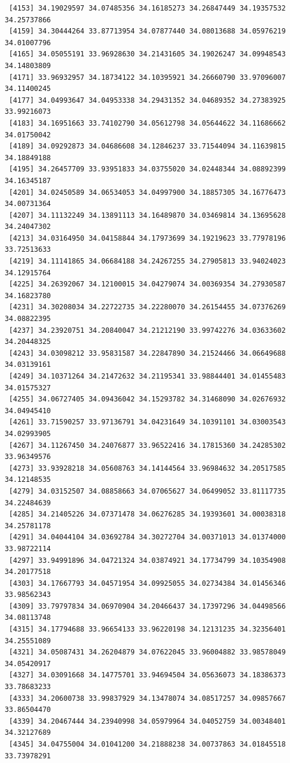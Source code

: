 \documentclass[
  letterpaper,
  DIV=11,
  numbers=noendperiod]{scrartcl}
\begin{document}
\begin{verbatim}
 [4153] 34.19029597 34.07485356 34.16185273 34.26847449 34.19357532 34.25737866
 [4159] 34.30444264 33.87713954 34.07877440 34.08013688 34.05976219 34.01007796
 [4165] 34.05055191 33.96928630 34.21431605 34.19026247 34.09948543 34.14803809
 [4171] 33.96932957 34.18734122 34.10395921 34.26660790 33.97096007 34.11400245
 [4177] 34.04993647 34.04953338 34.29431352 34.04689352 34.27383925 33.99216073
 [4183] 34.16951663 33.74102790 34.05612798 34.05644622 34.11686662 34.01750042
 [4189] 34.09292873 34.04686608 34.12846237 33.71544094 34.11639815 34.18849188
 [4195] 34.26457709 33.93951833 34.03755020 34.02448344 34.08892399 34.16345187
 [4201] 34.02450589 34.06534053 34.04997900 34.18857305 34.16776473 34.00731364
 [4207] 34.11132249 34.13891113 34.16489870 34.03469814 34.13695628 34.24047302
 [4213] 34.03164950 34.04158844 34.17973699 34.19219623 33.77978196 33.72513633
 [4219] 34.11141865 34.06684188 34.24267255 34.27905813 33.94024023 34.12915764
 [4225] 34.26392067 34.12100015 34.04279074 34.00369354 34.27930587 34.16823780
 [4231] 34.30208034 34.22722735 34.22280070 34.26154455 34.07376269 34.08822395
 [4237] 34.23920751 34.20840047 34.21212190 33.99742276 34.03633602 34.20448325
 [4243] 34.03098212 33.95831587 34.22847890 34.21524466 34.06649688 34.03139161
 [4249] 34.10371264 34.21472632 34.21195341 33.98844401 34.01455483 34.01575327
 [4255] 34.06727405 34.09436042 34.15293782 34.31468090 34.02676932 34.04945410
 [4261] 33.71590257 33.97136791 34.04231649 34.10391101 34.03003543 34.02993905
 [4267] 34.11267450 34.24076877 33.96522416 34.17815360 34.24285302 33.96349576
 [4273] 33.93928218 34.05608763 34.14144564 33.96984632 34.20517585 34.12148535
 [4279] 34.03152507 34.08858663 34.07065627 34.06499052 33.81117735 34.22484639
 [4285] 34.21405226 34.07371478 34.06276285 34.19393601 34.00038318 34.25781178
 [4291] 34.04044104 34.03692784 34.30272704 34.00371013 34.01374000 33.98722114
 [4297] 33.94991896 34.04721324 34.03874921 34.17734799 34.10354908 34.20177518
 [4303] 34.17667793 34.04571954 34.09925055 34.02734384 34.01456346 33.98562343
 [4309] 33.79797834 34.06970904 34.20466437 34.17397296 34.04498566 34.08113748
 [4315] 34.17794688 33.96654133 33.96220198 34.12131235 34.32356401 34.25551089
 [4321] 34.05087431 34.26204879 34.07622045 33.96004882 33.98578049 34.05420917
 [4327] 34.03091668 34.14775701 33.94694504 34.05636073 34.18386373 33.78683233
 [4333] 34.20600738 33.99837929 34.13478074 34.08517257 34.09857667 33.86504470
 [4339] 34.20467444 34.23940998 34.05979964 34.04052759 34.00348401 34.32127689
 [4345] 34.04755004 34.01041200 34.21888238 34.00737863 34.01845518 33.73978291

\end{verbatim}
\end{document}
